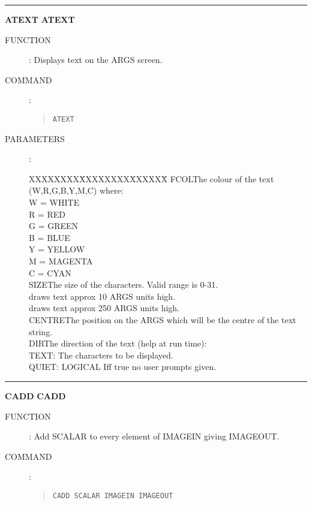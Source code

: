 \goodbreak
\rule{\textwidth}{0.3mm}
{\Large {\bf ATEXT} \hfill {\bf ATEXT}}
\begin{description}
\item [FUNCTION]:
Displays text on the ARGS screen.
\item [COMMAND]:
\begin{quote}
{\tt ATEXT}
\end{quote}
\item [PARAMETERS] :
\begin{tabbing}
XXXXXXXX\=XXXXXXXX\=XXXXXX\=\kill
FCOL\>\>The colour of the text (W,R,G,B,Y,M,C) where:\\
\>\>\>W  =  WHITE\\
\>\>\>R  =  RED\\
\>\>\>G  =  GREEN\\
\>\>\>B  =  BLUE\\
\>\>\>Y  =  YELLOW\\
\>\>\>M  =  MAGENTA\\
\>\>\>C  =  CYAN\\
SIZE\>\>The size of the characters. Valid range is 0-31.\\
\>\> draws text approx  10 ARGS units high.\\
\>\> draws text approx 250 ARGS units high.\\
CENTRE\>\>The position on the ARGS which will be the centre of the text
string.\\
DIR\>\>The direction of the text (help at run time):\\
\>\>\>TEXT: The characters to be displayed.\\
\>\>\>QUIET: LOGICAL Iff true no user prompts given.
\end{tabbing}
\end{description}

\goodbreak
\rule{\textwidth}{0.3mm}
{\Large {\bf CADD} \hfill {\bf CADD}}
\begin{description}
\item [FUNCTION]:
Add SCALAR to every element of IMAGEIN giving IMAGEOUT.
\item [COMMAND]:
\begin{quote}
{\tt CADD  SCALAR  IMAGEIN  IMAGEOUT}
\end{quote}
\end{description}

